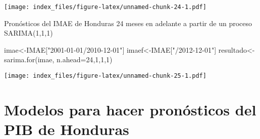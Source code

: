 \documentclass[
]{book}
\newenvironment{Shaded}{\begin{snugshade}}{\end{snugshade}}
\newcommand{\AttributeTok}[1]{\textcolor[rgb]{0.77,0.63,0.00}{#1}}
\newcommand{\ConstantTok}[1]{\textcolor[rgb]{0.00,0.00,0.00}{#1}}
\newcommand{\DecValTok}[1]{\textcolor[rgb]{0.00,0.00,0.81}{#1}}
\newcommand{\FunctionTok}[1]{\textcolor[rgb]{0.00,0.00,0.00}{#1}}
\newcommand{\NormalTok}[1]{#1}
\newcommand{\OtherTok}[1]{\textcolor[rgb]{0.56,0.35,0.01}{#1}}
\newcommand{\SpecialCharTok}[1]{\textcolor[rgb]{0.00,0.00,0.00}{#1}}
\newcommand{\StringTok}[1]{\textcolor[rgb]{0.31,0.60,0.02}{#1}}
\begin{document}
\begin{Shaded}
\end{Shaded}

\texttt{[image: index\_files/figure-latex/unnamed-chunk-24-1.pdf]}

Pronósticos del IMAE de Honduras 24 meses en adelante a partir de un proceso SARIMA(1,1,1)

\begin{Shaded}
\begin{Highlighting}[]
\NormalTok{imae}\OtherTok{\textless{}{-}}\NormalTok{IMAE[}\StringTok{"2001{-}01{-}01/2010{-}12{-}01"}\NormalTok{]}
\NormalTok{imaef}\OtherTok{\textless{}{-}}\NormalTok{IMAE[}\StringTok{"/2012{-}12{-}01"}\NormalTok{]}
\NormalTok{resultado}\OtherTok{\textless{}{-}}\FunctionTok{sarima.for}\NormalTok{(imae, }\AttributeTok{n.ahead=}\DecValTok{24}\NormalTok{,}\DecValTok{1}\NormalTok{,}\DecValTok{1}\NormalTok{,}\DecValTok{1}\NormalTok{)}
\end{Highlighting}
\end{Shaded}

\texttt{[image: index\_files/figure-latex/unnamed-chunk-25-1.pdf]}

\hypertarget{modelos-para-hacer-pronuxf3sticos-del-pib-de-honduras}{%
\section{Modelos para hacer pronósticos del PIB de Honduras}\label{modelos-para-hacer-pronuxf3sticos-del-pib-de-honduras}}
\end{document}
